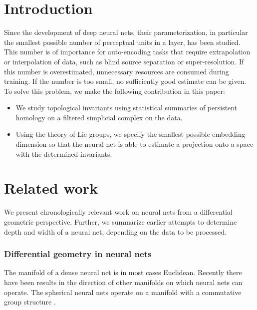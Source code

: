\documentclass[runningheads,orivec]{llncs}
\begin{document}
\section{Introduction}
Since the development of deep neural nets, their parameterization, in particular the smallest possible number of perceptual units in a layer, has been studied. This number is of importance for auto-encoding tasks that require extrapolation or interpolation of data, such as blind source separation or super-resolution. If this number is overestimated, unnecessary resources are consumed during training. If the number is too small, no sufficiently good estimate can be given. To solve this problem, we make the following contribution in this paper:
\begin{itemize}
    \item We study topological invariants using statistical summaries of persistent homology on a filtered simplicial complex on the data.
    \item Using the theory of Lie groups, we specify the smallest possible embedding dimension so that the neural net is able to estimate a projection onto a space with the determined invariants.
\end{itemize}

\section{Related work}
We present chronologically relevant work on neural nets from a differential geometric perspective. Further, we summarize earlier attempts to determine depth and width of a neural net, depending on the data to be processed.

\subsubsection*{Differential geometry in neural nets} The manifold of a dense neural net is in most cases Euclidean. Recently there have been results in the direction of other manifolds on which neural nets can operate. The spherical neural nets operate on a manifold with a commutative group structure \cite{CohenGKW18}.
\end{document}
